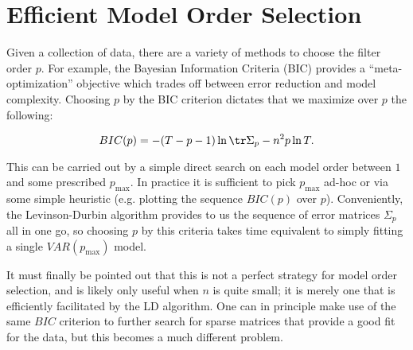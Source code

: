 \documentclass[12pt]{article}
\begin{document}
\section{Efficient Model Order Selection}
Given a collection of data, there are a variety of methods to choose
the filter order $p$.  For example, the Bayesian Information Criteria
(BIC) provides a ``meta-optimization'' objective which trades off
between error reduction and model complexity.  Choosing $p$ by the
BIC criterion dictates that we maximize over $p$ the following:

\begin{equation}
  \label{eqn:bic}
    BIC(p) = -(T - p - 1) \ln \tr \Sigma_p - n^2p\ln T.\\
\end{equation}

This can be carried out by a simple direct search on each model order
between $1$ and some prescribed $p_\text{max}$.  In practice it is
sufficient to pick $p_\text{max}$ ad-hoc or via some simple heuristic
(e.g. plotting the sequence $BIC(p)$ over $p$).  Conveniently, the
Levinson-Durbin algorithm provides to us the sequence of error
matrices $\Sigma_p$ all in one go, so choosing $p$ by this criteria
takes time equivalent to simply fitting a single $VAR(p_{\text{max}})$
model.

It must finally be pointed out that this is not a perfect strategy for
model order selection, and is likely only useful when $n$ is quite
small; it is merely one that is efficiently facilitated by the LD
algorithm.  One can in principle make use of the same $BIC$ criterion
to further search for sparse matrices that provide a good fit for the
data, but this becomes a much different problem.
\end{document}
